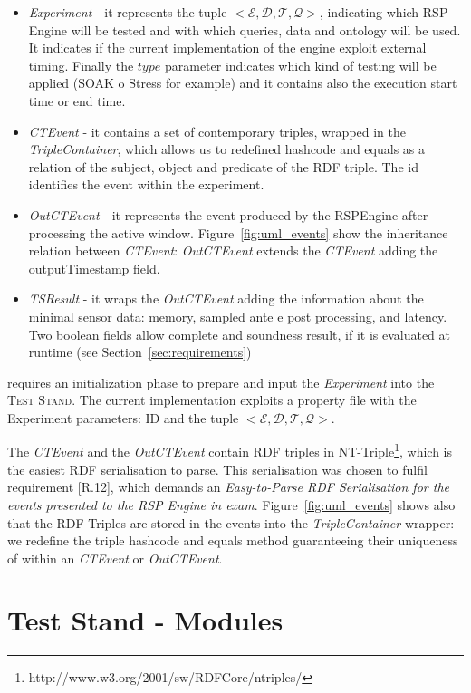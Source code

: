\begin{itemize}
\item \textit{Experiment} - it represents the tuple $<\mathcal{E}, \mathcal{D},\mathcal{T},\mathcal{Q}>$, indicating which RSP Engine will be tested and with which queries, data and ontology will be used. It indicates if the current implementation of the engine exploit external timing. Finally the $type$ parameter indicates which kind of testing will be applied (SOAK o Stress for example) and it contains also the execution start time or end time.
\item \textit{CTEvent} - it contains a set of contemporary triples, wrapped in the \textit{TripleContainer}, which allows us to redefined hashcode and equals as a relation of the subject, object and predicate of the RDF triple. The id identifies the event within the experiment.
\item \textit{OutCTEvent} - it represents the event produced by the RSPEngine after processing the active window. Figure~\ref{fig:uml_events} show the inheritance relation between \textit{CTEvent}:  \textit{OutCTEvent} extends the \textit{CTEvent} adding the outputTimestamp field.
\item \textit{TSResult} - it wraps the \textit{OutCTEvent} adding the information about the minimal sensor data: memory, sampled ante e post processing, and latency. Two boolean fields allow complete and soundness result, if it is evaluated at runtime (see Section~\ref{sec:requirements})
\end{itemize}

\name requires an initialization phase to prepare and input the \textit{Experiment} into the \textsc{Test Stand}. The current implementation exploits a property file with the Experiment parameters: ID and the tuple $<\mathcal{E}, \mathcal{D},\mathcal{T},\mathcal{Q}>$. 

The \textit{CTEvent} and the \textit{OutCTEvent} contain RDF triples in NT-Triple\footnote{http://www.w3.org/2001/sw/RDFCore/ntriples/}, which is the easiest RDF serialisation to parse. This serialisation was chosen to fulfil requirement [R.12], which demands an \textit{Easy-to-Parse RDF Serialisation for the events presented to the RSP Engine in exam}. Figure~\ref{fig:uml_events} shows also that the RDF Triples are stored in the events into the \textit{TripleContainer} wrapper: we redefine the triple hashcode and equals method guaranteeing their uniqueness of within an \textit{CTEvent} or \textit{OutCTEvent}.

\section{Test Stand - Modules}\label{sec:modules-impl}

